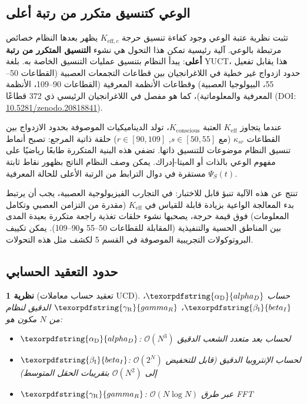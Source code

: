 \documentclass[12pt,a4paper]{article}
\newtheorem{theorem}{نظرية}
\DeclareRobustCommand{\alD}{\texorpdfstring{\ensuremath{\alpha_{\mathrm{D}}}}{alpha_D}}
\DeclareRobustCommand{\beI}{\texorpdfstring{\ensuremath{\beta_{\mathrm{I}}}}{beta_I}}
\DeclareRobustCommand{\gaR}{\texorpdfstring{\ensuremath{\gamma_{\mathrm{R}}}}{gamma_R}}
\newcommand{\eff}{\mathrm{eff}}
\begin{document}
	\subsection{الوعي كتنسيق متكرر من رتبة أعلى}
	\label{subsec:recursive-coordination}
	
	تثبت نظرية عتبة الوعي وجود كفاءة تنسيق حرجة \(K_{\eff,c}\) يظهر بعدها النظام خصائص مرتبطة بالوعي. آلية رئيسية تمكن هذا التحول هي نشوء \textbf{التنسيق المتكرر من رتبة أعلى}: يبدأ النظام بتنسيق عمليات التنسيق الخاصة به. بلغة YUCT، هذا يقابل تفعيل حدود ازدواج غير خطية في اللاغرانجيان بين قطاعات التجمعات العصبية (القطاعات 50--55، البيولوجيا العصبية) وقطاعات الأنظمة المعرفية (القطاعات 90--109، الأنظمة المعرفية والمعلوماتية)، كما هو مفصل في اللاغرانجيان الرئيسي ذي 372 قطاعًا (DOI: \href{https://doi.org/10.5281/zenodo.20818841}{10.5281/zenodo.20818841}).
	
	عندما يتجاوز \(K_{\eff}\) العتبة \(K_{\mathrm{conscious}}\)، تولد الديناميكيات الموصوفة بحدود الازدواج بين القطاعات \(\kappa_{sr}\) (مع \(s\in[50,55]\), \(r\in[90,109]\)) حلقة ذاتية المرجع: تصبح أنماط تنسيق النظام موضوعات للتنسيق ذاتها. تضفي هذه البنية المتكررة طابعًا رياضيًا على مفهوم الوعي بالذات أو الميتا-إدراك. يمكن وصف النظام الناتج بظهور نقاط ثابتة مستقرة في دوال الترابط من الرتبة الأعلى للحالة المعرفية \(\Psi_S(t)\).
	
	تنتج عن هذه الآلية تنبؤ قابل للاختبار: في التجارب الفيزيولوجية العصبية، يجب أن يرتبط بدء المعالجة الواعية بزيادة قابلة للقياس في \(K_{\eff}\) (مقدرة من التزامن العصبي وتكامل المعلومات) فوق قيمة حرجة، يصحبها نشوء حلقات تغذية راجعة متكررة بعيدة المدى بين المناطق الحسية والتنفيذية (المقابلة للقطاعات 50--55 و90--109). يمكن تكييف البروتوكولات التجريبية الموصوفة في القسم 5 لكشف مثل هذه التحولات.
	
	\subsection{حدود التعقيد الحسابي}
	
	\begin{theorem}[تعقيد حساب معاملات UCD]
		حساب \(\alD\)، \(\beI\)، \(\gaR\) الدقيق لنظام من \(N\) مكون هو:
		\begin{itemize}
			\item \(\alD\): \(\mathcal{O}(N^3)\) لحساب بعد متعدد الشعب الدقيق
			\item \(\beI\): \(\mathcal{O}(2^N)\) لحساب الإنتروبيا الدقيق (قابل للتخفيض إلى \(\mathcal{O}(N^2)\) بتقريبات الحقل المتوسط)
			\item \(\gaR\): \(\mathcal{O}(N \log N)\) عبر طرق FFT
		\end{itemize}
	\end{theorem}
	
\end{document}
